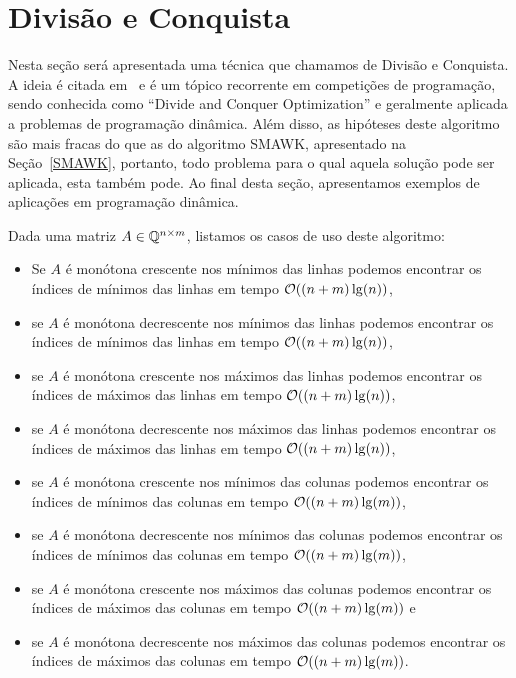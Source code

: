 \section{Divisão e Conquista}
\label{DivisaoEConquista}


Nesta seção será apresentada uma técnica que chamamos de Divisão e Conquista. A ideia é citada em~\cite{Aggarwal:1887} e é um tópico recorrente em competições de programação, sendo conhecida como ``Divide and Conquer Optimization'' e geralmente aplicada a problemas de programação dinâmica. Além disso, as hipóteses deste algoritmo são mais fracas do que as do algoritmo SMAWK, apresentado na Seção~\ref{SMAWK}, portanto, todo problema para o qual aquela solução pode ser aplicada, esta também pode. Ao final desta seção, apresentamos exemplos de aplicações em programação dinâmica.  

Dada uma matriz $A \in \mathbb{Q}^{n \times m}$, listamos os casos de uso deste algoritmo:
\begin{itemize}
    \item Se $A$ é monótona crescente nos mínimos das linhas podemos encontrar os índices de mínimos das linhas em tempo $\mathcal{O}((n+m)\lg(n))$, 
    \item se $A$ é monótona decrescente nos mínimos das linhas podemos encontrar os índices de mínimos das linhas em tempo $\mathcal{O}((n+m)\lg(n))$, 
    \item se $A$ é monótona crescente nos máximos das linhas podemos encontrar os índices de máximos das linhas em tempo $\mathcal{O}((n+m)\lg(n))$, 
    \item se $A$ é monótona decrescente nos máximos das linhas podemos encontrar os índices de máximos das linhas em tempo $\mathcal{O}((n+m)\lg(n))$, 
    \item se $A$ é monótona crescente nos mínimos das colunas podemos encontrar os índices de mínimos das colunas em tempo $\mathcal{O}((n+m)\lg(m))$, 
    \item se $A$ é monótona decrescente nos mínimos das colunas podemos encontrar os índices de mínimos das colunas em tempo $\mathcal{O}((n+m)\lg(m))$, 
    \item se $A$ é monótona crescente nos máximos das colunas podemos encontrar os índices de máximos das colunas em tempo $\mathcal{O}((n+m)\lg(m))$ e 
    \item se $A$ é monótona decrescente nos máximos das colunas podemos encontrar os índices de máximos das colunas em tempo $\mathcal{O}((n+m)\lg(m))$.
\end{itemize}

